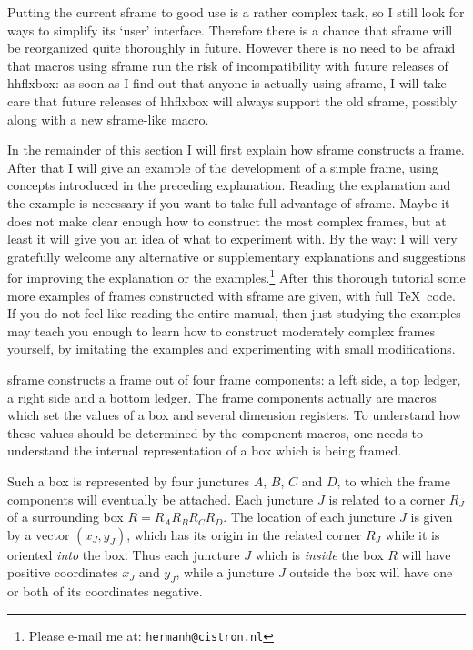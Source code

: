 \documentclass[11pt]{article}
\makeatletter
\def\packagename#1{{\sffamily #1}}     %
\def\macroname#1{{\ttfamily\@ttbs#1}}  %
\def\hhflxbox{\packagename{hhflxbox}\xspace}
\def\<#1>{\macroname{#1}}
\makeatother
\begin{document}
Putting the current \<sframe> to good use is a rather complex task,
so I still look for ways to simplify its `user' interface.
Therefore there is a chance that \<sframe> will
be reorganized quite thoroughly in future. However there is no need
to be afraid that macros using \<sframe> run the risk of incompatibility
with future releases of \hhflxbox: as soon as I find out that anyone
is actually using \<sframe>, I will take care that future releases
of \hhflxbox will always support the old \<sframe>, possibly along
with a new \<sframe>-like macro.

In the remainder of this section I will first explain how \<sframe>
constructs a frame. After that I will give an example of the development
of a simple frame, using concepts introduced in the preceding explanation.
Reading the explanation and the example is necessary if you want to
take full advantage of \<sframe>. Maybe it does not make clear enough
how to construct the most complex frames, but at least it will give you
an idea of what to experiment with. By the way: I will very
gratefully welcome any alternative or supplementary explanations and
suggestions for improving the explanation or the examples.\footnote
{Please e-mail me at: \texttt{hermanh@cistron.nl}}
After this thorough tutorial some more examples of frames constructed
with \<sframe> are given, with full \TeX\ code. If you do not feel like
reading the entire manual, then just studying the examples may
teach you enough to learn how to construct moderately complex frames
yourself, by imitating the examples and experimenting with small
modifications.

\<sframe> constructs a frame out of four frame components: a left side,
a top ledger, a right side and a bottom ledger.
The frame components actually are macros which set the values of a
box and several dimension registers.
To understand how these values should be determined by the component
macros, one needs to understand the internal representation of a
box which is being framed.

Such a box is represented by four
junctures $A$, $B$, $C$ and $D$, to which the frame components will
eventually be attached. Each juncture $J$ is related to
a corner $R_J$ of a surrounding box $R = R_AR_BR_CR_D$. The location
of each juncture $J$ is given by a vector $(x_J,y_J)$, which has its
origin in the related corner $R_J$ while it is oriented \emph{into}
the box.
Thus each juncture $J$ which is \emph{inside} the box $R$ will have positive
coordinates $x_J$ and $y_J$, while a juncture $J$ outside the box
will have one or both of its coordinates negative.
\end{document}
